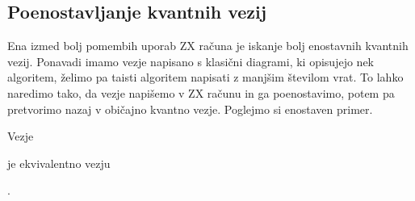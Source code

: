 \documentclass[mat1]{fmfdelo}
\begin{document}
\subsection{Poenostavljanje kvantnih vezij}
Ena izmed bolj pomembih uporab ZX računa je iskanje bolj enostavnih kvantnih vezij. Ponavadi imamo vezje napisano s klasični diagrami, ki opisujejo nek algoritem, želimo pa taisti algoritem napisati z manjšim številom vrat. To lahko naredimo tako, da vezje napišemo v ZX računu in ga poenostavimo, potem pa pretvorimo nazaj v običajno kvantno vezje. Poglejmo si enostaven primer.
\begin{izrek}
    Vezje
    \begin{center}
    \end{center}
    je ekvivalentno vezju
    \begin{center}
    \end{center}.
\end{izrek}
\end{document}
